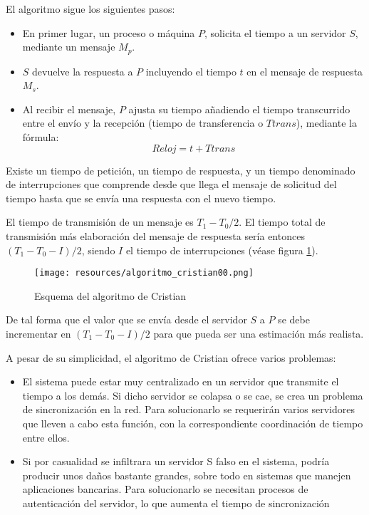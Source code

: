 \documentclass[a4paper, 11pt, titlepage]{article}
\begin{document}
            El algoritmo sigue los siguientes pasos:

            \begin{itemize}
                \item En primer lugar, un proceso o máquina $P$, solicita el tiempo a un 
                servidor $S$, mediante un mensaje $M_p$. 
                \item $S$ devuelve la respuesta a $P$ incluyendo el tiempo $t$ en el mensaje 
                de respuesta $M_s$.
                \item Al recibir el mensaje, $P$ ajusta su tiempo añadiendo el tiempo transcurrido 
                entre el envío y la recepción (tiempo de transferencia o $Ttrans$), mediante la fórmula: 
                \[Reloj = t + Ttrans\]
            \end{itemize}
    
            Existe un tiempo de petición, un tiempo de respuesta, y un tiempo denominado de interrupciones 
            que comprende desde que llega el mensaje de solicitud del tiempo hasta que se envía una 
            respuesta con el nuevo tiempo.

            El tiempo de transmisión de un mensaje es $T_1-T_0 / 2$. El tiempo total de transmisión más 
            elaboración del mensaje de respuesta sería entonces $(T_1-T_0-I) / 2$, siendo $I$ el tiempo 
            de interrupciones (véase figura \ref{algoritmo_cristian00}). 

            \begin{figure}[htp]
                \centering
                \texttt{[image: resources/algoritmo\_cristian00.png]}
                \caption{Esquema del algoritmo de Cristian}
                \label{algoritmo_cristian00}
            \end{figure}

            De tal forma que el valor que se envía desde el servidor $S$ a $P$ se debe incrementar en 
            $(T_1-T_0-I) / 2$ para que pueda ser una estimación más realista.

            A pesar de su simplicidad, el algoritmo de Cristian ofrece varios problemas:

            \begin{itemize}
                \item El sistema puede estar muy centralizado en un servidor que transmite el tiempo 
                a los demás. Si dicho servidor se colapsa o se cae, se crea un problema de sincronización 
                en la red. Para solucionarlo se requerirán varios servidores que lleven a cabo esta 
                función, con la correspondiente coordinación de tiempo entre ellos.
                \item Si por casualidad se infiltrara un servidor S falso en el sistema, podría producir 
                unos daños bastante grandes, sobre todo en sistemas que manejen aplicaciones bancarias. 
                Para solucionarlo se necesitan procesos de autenticación del servidor, lo que aumenta el 
                tiempo de sincronización
            \end{itemize}
\end{document}
